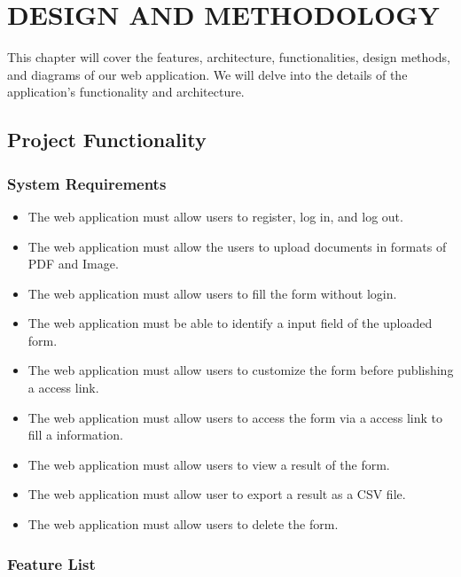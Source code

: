 \documentclass[12pt,oneside,openright,a4paper]{cpe-english-project}
\begin{document}
\chapter{DESIGN AND METHODOLOGY}

This chapter will cover the features, architecture, functionalities, design methods, and
diagrams of our web application. We will delve into the details of the application’s
functionality and architecture.

\section{Project Functionality}

\subsection{System Requirements}

\begin{itemize}
 \item The web application must allow users to register, log in, and log out. 
 \item The web application must allow the users to upload documents in formats of PDF and Image.
 \item The web application must allow users to fill the form without login.
 \item The web application must be able to identify a input field of the uploaded form.
 \item The web application must allow users to customize the form before publishing a access link.
 \item The web application must allow users to access the form via a access link to fill a information.
 \item The web application must allow users to view a result of the form.
 \item The web application must allow user to export a result as a CSV file.
 \item The web application must allow users to delete the form.
\end{itemize}

\subsection{Feature List}
\end{document}
